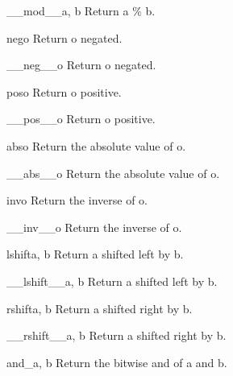 \begin{funcdesc}{__mod__}{a, b}
Return a \% b.
\end{funcdesc}

\begin{funcdesc}{neg}{o}
Return o negated.
\end{funcdesc}

\begin{funcdesc}{__neg__}{o}
Return o negated.
\end{funcdesc}

\begin{funcdesc}{pos}{o}
Return o positive.
\end{funcdesc}

\begin{funcdesc}{__pos__}{o}
Return o positive.
\end{funcdesc}

\begin{funcdesc}{abs}{o}
Return the absolute value of o.
\end{funcdesc}

\begin{funcdesc}{__abs__}{o}
Return the absolute value of o.
\end{funcdesc}

\begin{funcdesc}{inv}{o}
Return the inverse of o.
\end{funcdesc}

\begin{funcdesc}{__inv__}{o}
Return the inverse of o.
\end{funcdesc}

\begin{funcdesc}{lshift}{a, b}
Return a shifted left by b.
\end{funcdesc}

\begin{funcdesc}{__lshift__}{a, b}
Return a shifted left by b.
\end{funcdesc}

\begin{funcdesc}{rshift}{a, b}
Return a shifted right by b.
\end{funcdesc}

\begin{funcdesc}{__rshift__}{a, b}
Return a shifted right by b.
\end{funcdesc}

\begin{funcdesc}{and_}{a, b}
Return the bitwise and of a and b.
\end{funcdesc}

